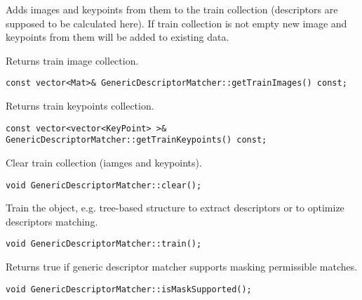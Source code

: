 Adds images and keypoints from them to the train collection (descriptors are supposed to be calculated here).
If train collection is not empty new image and keypoints from them will be added to 
existing data.


\begin{description}
\end{description}

Returns train image collection.

\begin{lstlisting}
const vector<Mat>& GenericDescriptorMatcher::getTrainImages() const;
\end{lstlisting}

Returns train keypoints collection.

\begin{lstlisting}
const vector<vector<KeyPoint> >& 
GenericDescriptorMatcher::getTrainKeypoints() const;
\end{lstlisting}

Clear train collection (iamges and keypoints).

\begin{lstlisting}
void GenericDescriptorMatcher::clear();
\end{lstlisting}

Train the object, e.g. tree-based structure to extract descriptors or 
to optimize descriptors matching.

\begin{lstlisting}
void GenericDescriptorMatcher::train();
\end{lstlisting}

Returns true if generic descriptor matcher supports masking permissible matches.

\begin{lstlisting}
void GenericDescriptorMatcher::isMaskSupported();
\end{lstlisting}

